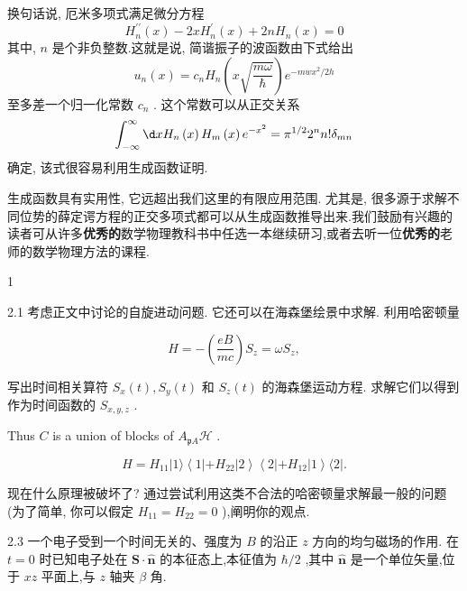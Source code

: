 换句话说, 厄米多项式满足微分方程
\begin{equation}
{H}_{n}^{\prime \prime }\left( x\right) - {2x}{H}_{n}^{\prime }\left( x\right) + {2n}{H}_{n}\left( x\right) = 0
\end{equation}
其中, $n$ 是个非负整数.这就是说, 简谐振子的波函数由下式给出
\begin{equation}
{u}_{n}\left( x\right) = {c}_{n}{H}_{n}\left( {x\sqrt{\frac{m\omega }{\hbar }}}\right) {e}^{-{mw}{x}^{2}/{2h}}
\end{equation}
至多差一个归一化常数 ${c}_{n}$ . 这个常数可以从正交关系
\begin{equation}
\int_{-\infty }^{\infty }{\d x}{H}_{n}\left( x\right) {H}_{m}\left( x\right) {e}^{-{x}^{2}} = {\pi }^{1/2}{2}^{n}n!{\delta }_{mn}
\end{equation}
确定, 该式很容易利用生成函数证明.

生成函数具有实用性, 它远超出我们这里的有限应用范围. 尤其是, 很多源于求解不同位势的薛定谔方程的正交多项式都可以从生成函数推导出来.我们鼓励有兴趣的读者可从许多\textbf{优秀的}数学物理教科书中任选一本继续研习,或者去听一位\textbf{优秀的}老师的数学物理方法的课程.



\begin{problemset}
\item 1
\end{problemset}

2.1 考虑正文中讨论的自旋进动问题. 它还可以在海森堡绘景中求解. 利用哈密顿量

$$
H = - \left( \frac{eB}{mc}\right) {S}_{z} = \omega {S}_{z},
$$

写出时间相关算符 ${S}_{x}\left( t\right) ,{S}_{y}\left( t\right)$ 和 ${S}_{z}\left( t\right)$ 的海森堡运动方程. 求解它们以得到作为时间函数的 ${S}_{x, y, z}$ .

Thus $C$ is a union of blocks of ${A}_{\mathfrak{p}A}\mathcal{H}$ .

$$
H = {H}_{11}\left| {1\rangle \left\langle {1\left| {+{H}_{22}}\right| 2}\right\rangle \left\langle {2\left| {+{H}_{12}}\right| 1}\right\rangle \langle 2}\right| .
$$

现在什么原理被破坏了? 通过尝试利用这类不合法的哈密顿量求解最一般的问题 (为了简单, 你可以假定 ${H}_{11} = {H}_{22} = 0$ ),阐明你的观点.

2.3 一个电子受到一个时间无关的、强度为 $B$ 的沿正 $z$ 方向的均匀磁场的作用. 在 $t = 0$ 时已知电子处在 $\mathbf{S} \cdot \widehat{\mathbf{n}}$ 的本征态上,本征值为 $\hbar /2$ ,其中 $\widehat{\mathbf{n}}$ 是一个单位矢量,位于 ${xz}$ 平面上,与 $z$ 轴夹 $\beta$ 角.

